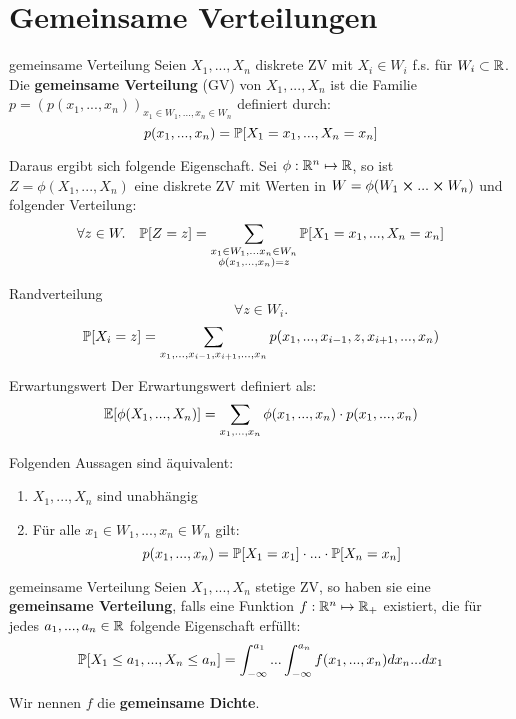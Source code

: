 \section*{Gemeinsame Verteilungen}



\begin{mainbox}{gemeinsame Verteilung}
    Seien $X_1,...,X_n$ diskrete ZV mit $X_i \in W_i$ f.s. für $W_i \subset \mathbb{R}$. Die \textbf{gemeinsame Verteilung} (GV) von $X_1,...,X_n$ ist die Familie $p = (p(x_1, ..., x_n))_{x_1 \in W_1, ..., x_n \in W_n}$ definiert durch:
    $$p(x_1, ..., x_n) = \mathbb{P}[X_1 = x_1, ..., X_n = x_n]$$
\end{mainbox}

Daraus ergibt sich folgende Eigenschaft. Sei $\phi: \mathbb{R}^n \mapsto \mathbb{R}$, so ist $Z = \phi(X_1,...,X_n)$ eine diskrete ZV mit Werten in $W = \phi(W_1 \cross ... \cross W_n)$ und folgender Verteilung:
$$\forall z \in W. \quad \mathbb{P}[Z = z] = \sum\limits_{ \substack{x_1 \in W_1, ... x_n \in W_n \\ \phi(x_1, ..., x_n) = z}} \mathbb{P}[X_1 = x_1, ..., X_n = x_n]$$

\begin{mainbox}{Randverteilung}
$$\forall z \in W_i.$$ $$\mathbb{P}[X_i = z] = \sum_{x_1, ..., x_{i-1}, x_{i+1},...,x_n} p(x_1, ..., x_{i-1}, z, x_{i+1},...,x_n)$$
\end{mainbox}

\begin{mainbox}
    {Erwartungswert}
    Der Erwartungswert definiert als:
$$\mathbb{E}[\phi(X_1, ..., X_n)] = \sum\limits_{x_1,...,x_n} \phi(x_1,...,x_n) \cdot p(x_1,...,x_n)$$
\end{mainbox} 

\Satz Folgenden Aussagen sind äquivalent:
\begin{enumerate}
    \item $X_1,...,X_n$ sind unabhängig
    \item Für alle $x_1 \in W_1, ..., x_n \in W_n$ gilt: 
    $$p(x_1,...,x_n) = \mathbb{P}[X_1 = x_1] \cdot ... \cdot \mathbb{P}[X_n = x_n]$$
\end{enumerate}



\begin{mainbox}{gemeinsame Verteilung}
    Seien $X_1,...,X_n$ stetige ZV, so haben sie eine \textbf{gemeinsame Verteilung}, falls eine Funktion $f: \mathbb{R}^n \mapsto \mathbb{R}_+$ existiert, die für jedes $a_1,...,a_n \in \mathbb{R}$ folgende Eigenschaft erfüllt:
    $$\mathbb{P}[X_1 \leq a_1,..., X_n \leq a_n] = \int_{-\infty}^{a_1} ... \int_{-\infty}^{a_n} f(x_1,..., x_n) dx_n ... dx_1$$
    
    Wir nennen $f$ die \textbf{gemeinsame Dichte}.
\end{mainbox}

